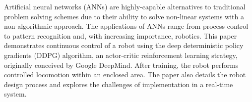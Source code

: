 Artificial neural networks (ANNs) are highly-capable alternatives to traditional problem solving schemes due to their ability to solve non-linear systems with a non-algorithmic approach. The applications of ANNs range from process control to pattern recognition and, with increasing importance, robotics. This paper demonstrates continuous control of a robot using the deep deterministic policy gradients (DDPG) algorithm, an actor-critic reinforcement learning strategy, originally conceived by Google DeepMind. After training, the robot performs controlled locomotion within an enclosed area. The paper also details the robot design process and explores the challenges of  implementation in a real-time system.